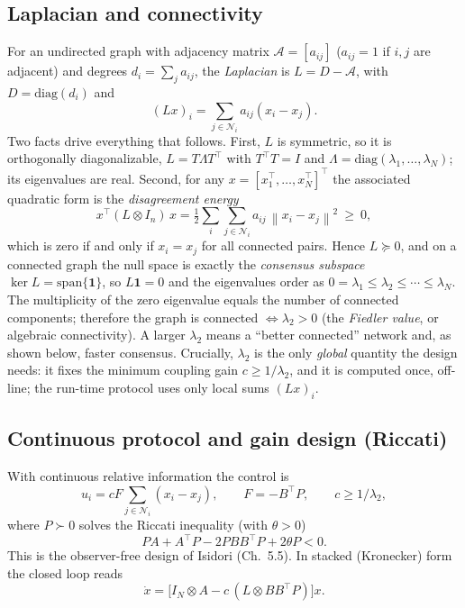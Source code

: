 \documentclass[11pt,a4paper]{article}
\theoremstyle{remark}
\newcommand{\Ni}{\mathcal{N}_i}
\newcommand{\kron}{\otimes}
\newcommand{\norm}[1]{\left\lVert#1\right\rVert}
\newcommand{\T}{^{\top}}
\begin{document}
\subsection{Laplacian and connectivity}
For an undirected graph with adjacency matrix $\mathcal A=[a_{ij}]$ ($a_{ij}=1$ if $i,j$ are
adjacent) and degrees $d_i=\sum_j a_{ij}$, the \emph{Laplacian} is $L=D-\mathcal A$, with
$D=\mathrm{diag}(d_i)$ and
\[
(Lx)_i = \sum_{j\in\Ni} a_{ij}(x_i - x_j).
\]
Two facts drive everything that follows. First, $L$ is symmetric, so it is orthogonally
diagonalizable, $L=T\Lambda T\T$ with $T\T T=I$ and $\Lambda=\mathrm{diag}(\lambda_1,\dots,\lambda_N)$;
its eigenvalues are real. Second, for any $x=[x_1\T,\dots,x_N\T]\T$ the associated quadratic form is
the \emph{disagreement energy}
\begin{equation}
x\T (L\kron I_n)\, x = \tfrac12\sum_{i}\sum_{j\in\Ni} a_{ij}\,\norm{x_i-x_j}^2 \ \ge\ 0,
\label{eq:quadform}
\end{equation}
which is zero if and only if $x_i=x_j$ for all connected pairs. Hence $L\succeq 0$, and on a
connected graph the null space is exactly the \emph{consensus subspace}
$\ker L = \mathrm{span}\{\mathbf 1\}$, so $L\mathbf 1=0$ and the eigenvalues order as
$0=\lambda_1\le\lambda_2\le\cdots\le\lambda_N$. The multiplicity of the zero eigenvalue equals the
number of connected components; therefore the graph is connected $\iff \lambda_2>0$ (the
\emph{Fiedler value}, or algebraic connectivity). A larger $\lambda_2$ means a ``better connected''
network and, as shown below, faster consensus. Crucially, $\lambda_2$ is the only \emph{global}
quantity the design needs: it fixes the minimum coupling gain $c\ge 1/\lambda_2$, and it is computed
once, off-line; the run-time protocol uses only local sums $(Lx)_i$.

\subsection{Continuous protocol and gain design (Riccati)}
With continuous relative information the control is
\begin{equation}
u_i = cF\sum_{j\in\Ni}(x_i - x_j), \qquad F = -B\T P, \qquad c \ge 1/\lambda_2,
\label{eq:ucont}
\end{equation}
where $P\succ 0$ solves the Riccati inequality (with $\theta>0$)
\begin{equation}
PA + A\T P - 2PBB\T P + 2\theta P < 0.
\label{eq:riccati}
\end{equation}
This is the observer-free design of Isidori (Ch.~5.5). In stacked (Kronecker) form the closed loop
reads
\begin{equation}
\dot x = \big[I_N\kron A - c\,(L\kron BB\T P)\big]x .
\label{eq:kron}
\end{equation}
\end{document}
